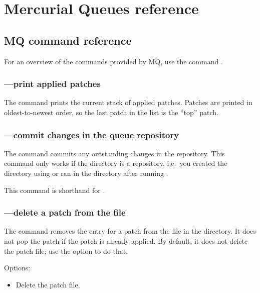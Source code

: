 \chapter{Mercurial Queues reference}

\section{MQ command reference}
\label{sec:mq:cmdref}

For an overview of the commands provided by MQ, use the command
.

\subsection{---print applied patches}

The  command prints the current stack of applied
patches.  Patches are printed in oldest-to-newest order, so the last
patch in the list is the ``top'' patch.

\subsection{---commit changes in the queue repository}

The  command commits any outstanding changes in the
 repository.  This command only works if the
 directory is a repository, i.e.~you created the
directory using  or ran
 in the directory after running .

This command is shorthand for .

\subsection{---delete a patch from the
   file}

The  command removes the entry for a patch from the
 file in the  directory.  It
does not pop the patch if the patch is already applied.  By default,
it does not delete the patch file; use the  option to
do that.

Options:
\begin{itemize}
\item[\hgopt{qdel}{-f}] Delete the patch file.
\end{itemize}


